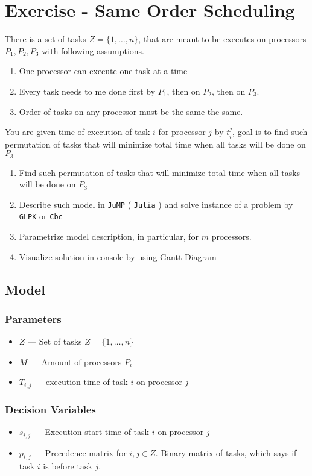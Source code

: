 \section{Exercise - Same Order Scheduling}
There is a set of tasks $Z = \{1, \dots , n\}$, 
that are meant to be executes on processors $P_1, P_2, P_3$ with following assumptions.
\begin{enumerate}
    \item One processor can execute one task at a time
    \item Every task needs to me done first by $P_1$, then on $P_2$, then on $P_3$.
    \item Order of tasks on any processor must be the same the same.
\end{enumerate}
You are given time of execution of task $i$ for processor $j$ by $t^j_i$,
goal is to find such permutation of tasks that will minimize total time when all tasks will be done on $P_3$
\begin{enumerate}
    \item Find such permutation of tasks that will minimize total time when all tasks will be done on $P_3$ \done
    \item Describe such model in \texttt{JuMP} ( \texttt{Julia} ) and solve instance of a problem by \texttt{GLPK} or \texttt{Cbc} \done
    \item Parametrize model description, in particular, for $m$ processors. \done  
    \item Visualize solution in console by using Gantt Diagram \done
\end{enumerate}

\subsection{Model}
\subsubsection*{Parameters}
\begin{itemize}
    \item $Z$ --- Set of tasks $Z = \{1, \dots , n\}$
    \item $M$ --- Amount of processors $P_i$
    \item $T_{i, j}$ --- execution time of task $i$ on processor $j$
\end{itemize}
\subsubsection*{Decision Variables}
\begin{itemize}
    \item $s_{i, j}$ --- Execution start time of task $i$ on processor $j$
    \item $p_{i, j}$ --- Precedence matrix for $i, j \in Z$. Binary matrix of tasks, which says if task $i$ is before task $j$.
\end{itemize}
